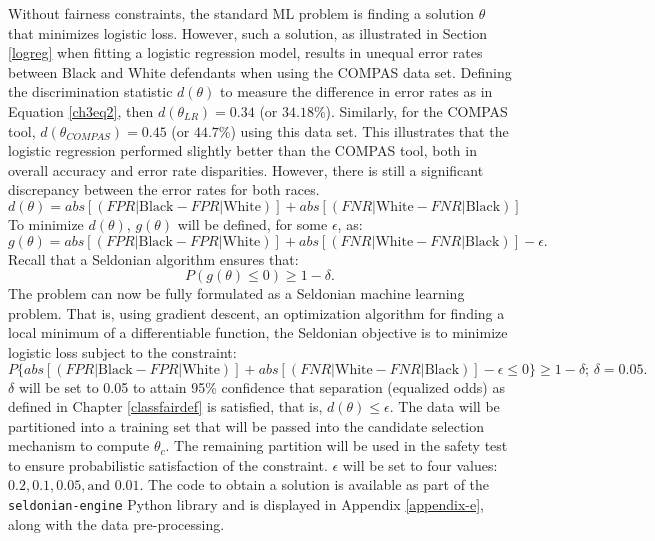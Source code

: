 \documentclass[12pt, twoside]{amherstthesis}
\begin{document}
Without fairness constraints, the standard ML problem is finding a solution \(\theta\) that minimizes logistic loss. However, such a solution, as illustrated in Section \ref{logreg} when fitting a logistic regression model, results in unequal error rates between Black and White defendants when using the COMPAS data set. Defining the discrimination statistic \(d(\theta)\) to measure the difference in error rates as in Equation \ref{ch3eq2}, then \(d(\theta_{LR}) = 0.34\) (or \(34.18\)\%). Similarly, for the COMPAS tool, \(d(\theta_{COMPAS}) = 0.45\) (or \(44.7\)\%) using this data set. This illustrates that the logistic regression performed slightly better than the COMPAS tool, both in overall accuracy and error rate disparities. However, there is still a significant discrepancy between the error rates for both races.
\begin{equation}
\label{ch3eq2}
d(\theta) = abs[(FPR | \text{Black} - FPR | \text{White})] + abs[(FNR | \text{White} - FNR | \text{Black})]
\end{equation}
\noindent To minimize \(d(\theta)\), \(g(\theta)\) will be defined, for some \(\epsilon\), as:
\begin{equation}
\label{ch3eq3}
g(\theta) = abs[(FPR | \text{Black} - FPR | \text{White})] + abs[(FNR | \text{White} - FNR | \text{Black})] - \epsilon.
\end{equation}
\noindent Recall that a Seldonian algorithm ensures that:
\begin{equation}
\label{ch3eq4}
P(g(\theta) \leq 0) \geq 1 - \delta.
\end{equation}
\noindent The problem can now be fully formulated as a Seldonian machine learning problem. That is, using gradient descent, an optimization algorithm for finding a local minimum of a differentiable function, the Seldonian objective is to minimize logistic loss subject to the constraint:
\begin{equation}
\label{ch3eq5}
P\{abs[(FPR | \text{Black} - FPR | \text{White})] + abs[(FNR | \text{White} - FNR | \text{Black})]  - \epsilon \leq 0 \} \geq 1 - \delta \textit{; } \delta = 0.05.
\end{equation}
\(\delta\) will be set to 0.05 to attain 95\% confidence that separation (equalized odds) as defined in Chapter \ref{classfairdef} is satisfied, that is, \(d(\theta) \leq \epsilon\). The data will be partitioned into a training set that will be passed into the candidate selection mechanism to compute \(\theta_c\). The remaining partition will be used in the safety test to ensure probabilistic satisfaction of the constraint. \(\epsilon\) will be set to four values: \(0.2, 0.1, 0.05, \text{and } 0.01\). The code to obtain a solution is available as part of the \texttt{seldonian-engine} Python library and is displayed in Appendix \ref{appendix-e}, along with the data pre-processing.
\end{document}
